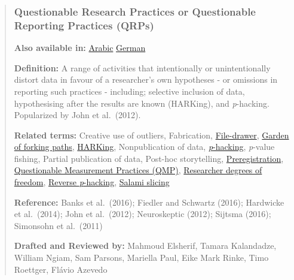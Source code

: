 \documentclass[
  letterpaper,
  DIV=11,
  numbers=noendperiod]{scrreprt}
\begin{document}
\begin{quote}
\mbox{}%
\subsubsection*{Questionable Research Practices or Questionable
Reporting Practices
(QRPs)}\label{questionable-research-practices-or-questionable-reporting-practices-qrps}

\textbf{Also available in:}
\href{https://forrt.org/glossary/arabic/questionable_research_practices_or_questionable_reporting_practices/}{Arabic}
\textbar{}
\href{https://forrt.org/glossary/german/questionable_research_practices_or_questionable_reporting_practices/}{German}
\textbar{}

\textbf{Definition:} A range of activities that intentionally or
unintentionally distort data in favour of a researcher's own hypotheses
- or omissions in reporting such practices - including; selective
inclusion of data, hypothesising after the results are known (HARKing),
and \emph{p}-hacking. Popularized by John et al.~(2012).

\textbf{Related terms:} Creative use of outliers, Fabrication,
\href{https://forrt.org/glossary/english/publication_bias/}{File-drawer},
\href{https://forrt.org/glossary/english/garden_of_forking_paths/}{Garden
of forking paths},
\href{https://forrt.org/glossary/english/harking/}{HARKing},
Nonpublication of data,
\href{https://forrt.org/glossary/english/p_hacking/}{\emph{p}-hacking},
\emph{p}-value fishing, Partial publication of data, Post-hoc
storytelling,
\href{https://forrt.org/glossary/english/preregistration/}{Preregistration},
\href{https://forrt.org/glossary/english/questionable_measurement_practices/}{Questionable
Measurement Practices (QMP)},
\href{https://forrt.org/glossary/english/researcher_degrees_of_freedom/}{Researcher
degrees of freedom},
\href{https://forrt.org/glossary/english/reverse_p_hacking/}{Reverse
\emph{p}-hacking},
\href{https://forrt.org/glossary/english/salami_slicing/}{Salami
slicing}

\textbf{Reference:} Banks et al.~(2016); Fiedler and Schwartz (2016);
Hardwicke et al.~(2014); John et al.~(2012); Neuroskeptic (2012);
Sijtsma (2016); Simonsohn et al.~(2011)

\textbf{Drafted and Reviewed by:} Mahmoud Elsherif, Tamara Kalandadze,
William Ngiam, Sam Parsons, Mariella Paul, Eike Mark Rinke, Timo
Roettger, Flávio Azevedo
\end{quote}
\end{document}
